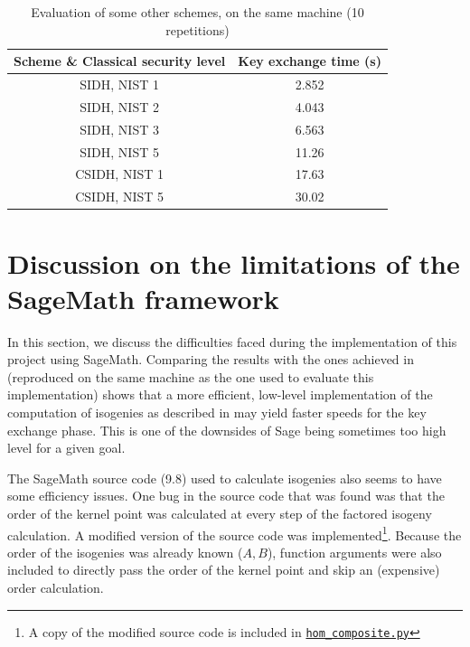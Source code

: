 \documentclass[a4paper,11pt,oneside]{report}
\begin{document}
    \begin{table}[!h]
        \label{result:more_table}
        \begin{center}
        \begin{tabular}{| c | c |}
        \hline
        \textbf{Scheme \& Classical security level} & \textbf{Key exchange time (s)} \\ 
        \hline

        SIDH, NIST 1 & 2.852 \\ \hline
        SIDH, NIST 2 & 4.043 \\ \hline
        SIDH, NIST 3 & 6.563 \\ \hline
        SIDH, NIST 5 & 11.26 \\ \hline
        CSIDH, NIST 1 & 17.63 \\ \hline
        CSIDH, NIST 5 & 30.02 \\ \hline
        \hline
        \end{tabular}
        \end{center}
        \caption{Evaluation of some other schemes, on the same machine (10 repetitions)}
    \end{table}

\section{Discussion on the limitations of the SageMath framework}
\label{discussion:limitations}

    In this section, we discuss the difficulties faced during the implementation of this project using SageMath. Comparing the results with the ones achieved in \cite{compression} (reproduced on the same machine as the one used to evaluate this implementation) shows that a more efficient, low-level implementation of the computation of isogenies as described in \cite{algorithms} may yield faster speeds for the key exchange phase. This is one of the downsides of Sage being sometimes too high level for a given goal.

    The SageMath source code (9.8) used to calculate isogenies also seems to have some efficiency issues. One bug in the source code that was found was that the order of the kernel point was calculated at every step of the factored isogeny calculation. A modified version of the source code was implemented\footnote{A copy of the modified source code is included in \href{https://github.com/mrztti/lasec-MSIDH/blob/main/hom\_composite.py}{\texttt{hom\_composite.py}}}. Because the order of the isogenies was already known ($A,B$), function arguments were also included to directly pass the order of the kernel point and skip an (expensive) order calculation.
    
\end{document}
